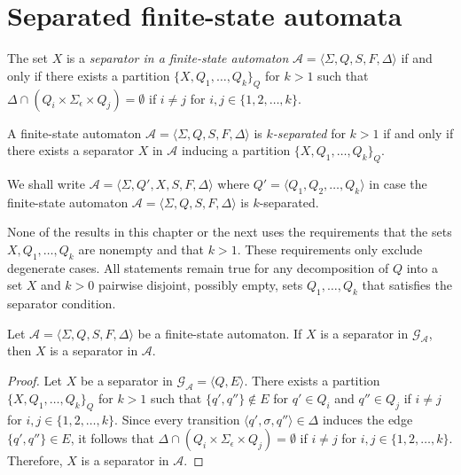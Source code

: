 \section{Separated finite-state automata}
\label{section:separated_finite_state_automata}

\begin{definition}
  The set $X$ is a \emph{separator in a finite-state automaton} $\mathcal{A} =
  \langle \Sigma, Q, S, F, \Delta \rangle$ if and only if there exists a partition
  $\{ X, Q_1, \ldots, Q_k \}_Q$ for $k > 1$ such that $\Delta \cap (Q_i \times
  \Sigma_\epsilon \times Q_j) = \emptyset$ if $i \neq j$ for $i, j \in \{ 1, 2,
  \ldots, k \}$.
\end{definition}

\begin{definition}
  A finite-state automaton $\mathcal{A} = \langle \Sigma, Q, S, F, \Delta \rangle$ is
  \emph{$k$-separated} for $k > 1$ if and only if there exists a separator $X$ in
  $\mathcal{A}$ inducing a partition $\{ X, Q_1, \ldots, Q_k \}_Q$.
\end{definition}

We shall write $\mathcal{A} = \langle \Sigma, Q', X, S, F, \Delta \rangle$ where $Q'
= \langle Q_1, Q_2, \ldots, Q_k \rangle$ in case the finite-state automaton
$\mathcal{A} = \langle \Sigma, Q, S, F, \Delta \rangle$ is $k$-separated.

None of the results in this chapter or the next uses the requirements that the sets
$X, Q_1, \ldots, Q_k$ are nonempty and that $k > 1$. These requirements only exclude
degenerate cases. All statements remain true for any decomposition of $Q$ into a set
$X$ and $k > 0$ pairwise disjoint, possibly empty, sets $Q_1, \ldots, Q_k$ that
satisfies the separator condition.

\begin{proposition}
  Let $\mathcal{A} = \langle \Sigma, Q, S, F, \Delta \rangle$ be a finite-state
  automaton. If $X$ is a separator in $\mathcal{G}_\mathcal{A}$, then $X$ is a
  separator in $\mathcal{A}$.
\end{proposition}

\begin{proof}
  Let $X$ be a separator in $\mathcal{G}_\mathcal{A} = \langle Q, E \rangle$. There
  exists a partition $\{ X, Q_1, \ldots, Q_k \}_Q$ for $k > 1$ such that $\{
  q', q'' \} \not\in E$ for $q' \in Q_i$ and $q'' \in Q_j$ if $i \neq j$ for $i, j
  \in \{ 1, 2, \ldots, k \}$. Since every transition $\langle q', \sigma, q''
  \rangle \in \Delta$ induces the edge $\{ q', q'' \} \in E$, it follows that $\Delta \cap (Q_i \times
  \Sigma_\epsilon \times Q_j) = \emptyset$ if $i \neq j$ for $i, j \in \{ 1, 2,
  \ldots, k \}$. Therefore, $X$ is a separator in $\mathcal{A}$.
\end{proof}


